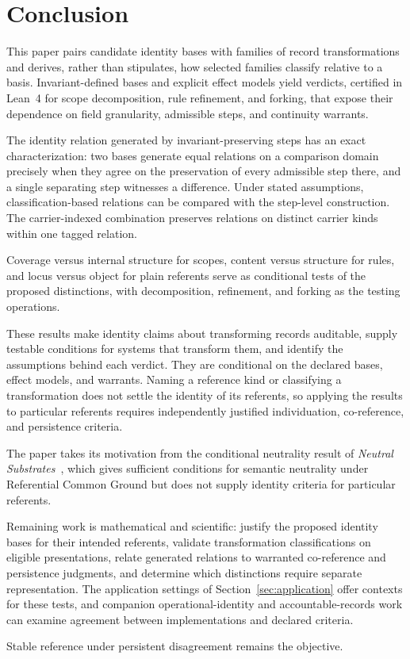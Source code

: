 
\section{Conclusion}
\label{sec:conclusion}

This paper pairs candidate identity bases with families of record
transformations and derives, rather than stipulates, how selected
families classify relative to a basis.
Invariant-defined bases and explicit effect models yield verdicts,
certified in Lean~4 for scope decomposition, rule refinement, and
forking, that expose their dependence on field granularity, admissible
steps, and continuity warrants.

The identity relation generated by invariant-preserving steps has an
exact characterization: two bases generate equal relations on a
comparison domain precisely when they agree on the preservation of
every admissible step there, and a single separating step witnesses a
difference.
Under stated assumptions, classification-based relations can be
compared with the step-level construction.
The carrier-indexed combination preserves relations on distinct
carrier kinds within one tagged relation.

Coverage versus internal structure for scopes, content versus
structure for rules, and locus versus object for plain referents serve
as conditional tests of the proposed distinctions, with decomposition,
refinement, and forking as the testing operations.

These results make identity claims about transforming records
auditable, supply testable conditions for systems that transform them,
and identify the assumptions behind each verdict.
They are conditional on the declared bases, effect models, and
warrants.
Naming a reference kind or classifying a transformation does not
settle the identity of its referents, so applying the results to
particular referents requires independently justified individuation,
co-reference, and persistence criteria.

The paper takes its motivation from the conditional neutrality result of
\emph{Neutral Substrates}~\citep{case2026neutral}, which gives
sufficient conditions for semantic neutrality under Referential Common
Ground but does not supply identity criteria for particular referents.

Remaining work is mathematical and scientific: justify the proposed
identity bases for their intended referents, validate transformation
classifications on eligible presentations, relate generated relations
to warranted co-reference and persistence judgments, and determine
which distinctions require separate representation.
The application settings of Section~\ref{sec:application} offer
contexts for these tests, and companion operational-identity and
accountable-records work can examine agreement between implementations
and declared criteria.

Stable reference under persistent disagreement remains the objective.
